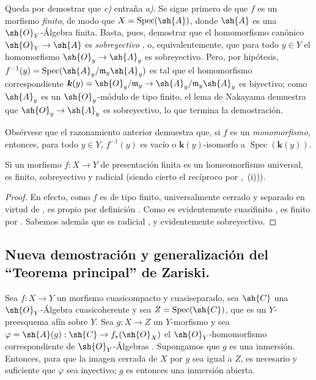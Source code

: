 Queda por demostrar que \emph{c)} entraña \emph{a)}.
Se sigue primero de  que $f$ es un morfismo \emph{finito}, de modo que $X=\operatorname{Spec}(\sh{A})$, donde $\sh{A}$ es una $\sh{O}_Y$-Álgebra finita.
Basta, pues, demostrar que el homomorfismo canónico $\sh{O}_Y\to\sh{A}$ es \emph{sobreyectivo} , o, equivalentemente, que para todo $y\in Y$ el homomorfismo $\sh{O}_y\to\sh{A}_y$ es sobreyectivo.
Pero, por hipótesis,
$f^{-1}(y)=\operatorname{Spec}(\sh{A}_y/\mathfrak{m}_y\sh{A}_y)$  es tal que el homomorfismo correspondiente $\boldsymbol k(y)=\sh{O}_y/\mathfrak{m}_y\to\sh{A}_y/\mathfrak{m}_y\sh{A}_y$ es biyectivo; como $\sh{A}_y$ es un $\sh{O}_y$-módulo de tipo finito, el lema de Nakayama demuestra que $\sh{O}_y\to\sh{A}_y$ es sobreyectivo, lo que termina la demostración.

\begin{remark}[8.11.5.1]
\label{IV.8.11.5.1}
Obsérvese que el razonamiento anterior demuestra que, si $f$ es un \emph{monomorfismo}, entonces, para todo $y\in Y$, $f^{-1}(y)$ es vacío o $\boldsymbol k(y)$-isomorfo a $\operatorname{Spec}(\boldsymbol k(y))$.
\end{remark}

\begin{proposition}[8.11.6]
\label{IV.8.11.6}
Si un morfismo $f:X\to Y$ de presentación finita es un homeomorfismo universal, es finito, sobreyectivo y radicial (siendo cierto el recíproco por ,~(i))).
\end{proposition}

\begin{proof}
En efecto, como $f$ es de tipo finito, universalmente cerrado y separado en virtud de , es propio por definición .
Como es evidentemente cuasifinito , es finito por .
Sabemos además que es radicial , y evidentemente sobreyectivo.
\end{proof}

\subsection{Nueva demostración y generalización del ``Teorema principal'' de Zariski.}
\label{subsection:IV.8.12}
\label{IV.8.12}

\begin{lemma}[8.12.1]
\label{IV.8.12.1}
Sea $f:X\to Y$ un morfismo cuasicompacto y cuasiseparado, sea $\sh{C}$ una $\sh{O}_Y$-Álgebra cuasicoherente y sea $Z=\operatorname{Spec}(\sh{C})$, que es un $Y$-preesquema afín sobre $Y$.
Sea $g:X\to Z$ un $Y$-morfismo y sea $\varphi=\sh{A}(g):\sh{C}\to f_*(\sh{O}_X)$ el $\sh{O}_Y$-homomorfismo correspondiente de $\sh{O}_Y$-Álgebras .
Supongamos que $g$ es una inmersión.
Entonces, para que la imagen cerrada de $X$ por $g$  sea igual a $Z$, es necesario y suficiente que $\varphi$ sea inyectivo; $g$ es entonces una inmersión abierta.
\end{lemma}

